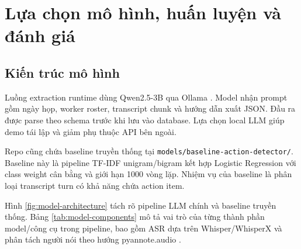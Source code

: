 \chapter{Lựa chọn mô hình, huấn luyện và đánh giá}

\section{Kiến trúc mô hình}

Luồng extraction runtime dùng Qwen2.5-3B qua Ollama \cite{qwen2024}. Model nhận prompt gồm ngày họp, worker roster, transcript chunk và hướng dẫn xuất JSON. Đầu ra được parse theo schema trước khi lưu vào database. Lựa chọn local LLM giúp demo tái lập và giảm phụ thuộc API bên ngoài.

Repo cũng chứa baseline truyền thống tại \texttt{models/baseline-action-detector/}. Baseline này là pipeline TF-IDF unigram/bigram kết hợp Logistic Regression với class weight cân bằng và giới hạn 1000 vòng lặp. Nhiệm vụ của baseline là phân loại transcript turn có khả năng chứa action item.

Hình \ref{fig:model-architecture} tách rõ pipeline LLM chính và baseline truyền thống. Bảng \ref{tab:model-components} mô tả vai trò của từng thành phần model/công cụ trong pipeline, bao gồm ASR dựa trên Whisper/WhisperX \cite{radford2022whisper,bain2022whisperx} và phân tách người nói theo hướng pyannote.audio \cite{bredin2023pyannote}.

